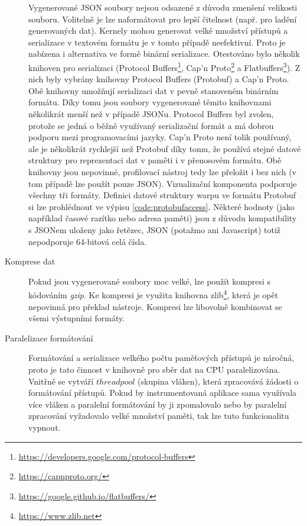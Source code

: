 \begin{description}
    Vygenerované JSON soubory nejsou odsazené z důvodu zmenšení velikosti souboru. Volitelně je lze naformátovat pro lepší čitelnost (např. pro ladění generovaných dat). Kernely mohou generovat velké množství přístupů a serializace v textovém formátu je v tomto případě neefektivní. Proto je nabízena i alternativa ve formě binární serializace. Otestováno bylo několik knihoven pro serializaci (Protocol Buffers\footnote{\url{https://developers.google.com/protocol-buffers}}, Cap'n Proto\footnote{\url{https://capnproto.org/}} a Flatbuffers\footnote{\url{https://google.github.io/flatbuffers/}}). Z nich byly vybrány knihovny Protocol Buffers (Protobuf) a Cap'n Proto. Obě knihovny umožňují serializaci dat v pevně stanoveném binárním formátu. Díky tomu jsou soubory vygenerované těmito knihovnami několikrát menší než v případě JSONu. Protocol Buffers byl zvolen, protože se jedná o běžně využívaný serializační formát a má dobrou podporu mezi programovacími jazyky. Cap'n Proto není tolik používaný, ale je několikrát rychlejší než Protobuf díky tomu, že používá stejné datové struktury pro reprezentaci dat v paměti i v přenosovém formátu. Obě knihovny jsou nepovinné, profilovací nástroj tedy lze přeložit i bez nich (v tom případě lze použít pouze JSON). Vizualizační komponenta podporuje všechny tři formáty. Definici datové struktury warpu ve formátu Protobuf si lze prohlédnout ve výpisu \ref{code:protobufaccess}. Některé hodnoty (jako například časové razítko nebo adresa paměti) jsou z důvodu kompatibility s JSONem uloženy jako řetězec, JSON (potažmo ani Javascript) totiž nepodporuje 64-bitová celá čísla.
    \item[Komprese dat] Pokud jsou vygenerované soubory moc velké, lze použít kompresi s kódováním \emph{gzip}. Ke kompresi je využita knihovna zlib\footnote{\url{https://www.zlib.net}}, která je opět nepovinná pro překlad nástroje. Kompresi lze libovolně kombinovat se všemi výstupními formáty.
    \item[Paralelizace formátování] Formátování a serializace velkého počtu paměťových přístupů je náročná, proto je tato činnost v knihovně pro sběr dat na CPU paralelizována. Vnitřně se vytváří $thread pool$ (skupina vláken), která zpracovává žádosti o formátování přístupů. Pokud by instrumentovaná aplikace sama využívala více vláken a paralelní formátování by ji zpomalovalo nebo by paralelní zpracování vyžadovalo velké množství paměti, tak lze tuto funkcionalitu vypnout.
\end{description}
